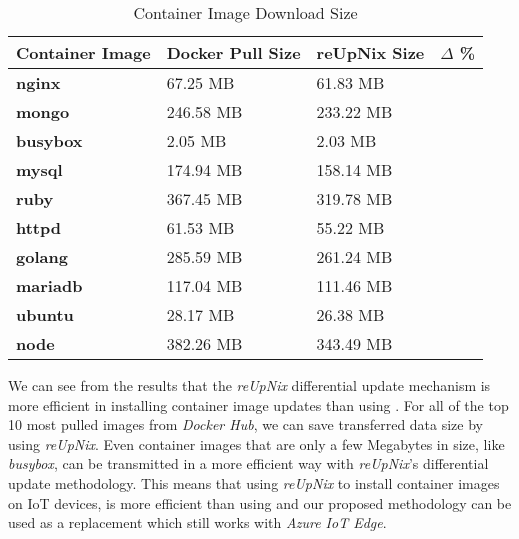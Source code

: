 \clearpage

\begin{table}[H]
	\centering
	\begin{tabular}{l|l|l|l}
	\toprule
		Container Image & Docker Pull Size & reUpNix Size & $\Delta$ \% \\
	\midrule
    \textbf{nginx} & 67.25 MB & 61.83 MB & \color{ba-green}{- 8.0\%} \\
    \textbf{mongo} & 246.58 MB & 233.22 MB & \color{ba-green}{- 5.6\%} \\
    \textbf{busybox} & 2.05 MB & 2.03 MB & \color{ba-green}{- 0.9\%} \\
    \textbf{mysql} & 174.94 MB & 158.14 MB & \color{ba-green}{- 9.6\%} \\
    \textbf{ruby} & 367.45 MB & 319.78 MB & \color{ba-green}{- 12.9\%} \\
    \textbf{httpd} & 61.53 MB & 55.22 MB & \color{ba-green}{- 10.2\%} \\
    \textbf{golang} & 285.59 MB & 261.24 MB & \color{ba-green}{- 8.5\%} \\
    \textbf{mariadb} & 117.04 MB & 111.46 MB & \color{ba-green}{- 4.7\%} \\
    \textbf{ubuntu} & 28.17 MB & 26.38 MB & \color{ba-green}{- 6.3\%} \\
    \textbf{node} & 382.26 MB & 343.49 MB & \color{ba-green}{- 10.1\%} \\
	\bottomrule
	\end{tabular}
	\caption{Container Image Download Size}
	\label{tab:container-size}
\end{table}

\noindent
We can see from the results that the \textit{reUpNix} differential update mechanism
is more efficient in installing container image updates than using .
For all of the top 10 most pulled images from \textit{Docker Hub}, we can save
transferred data size by using \textit{reUpNix}. Even container images that are
only a few Megabytes in size, like \textit{busybox}, can be transmitted in a more
efficient way with \textit{reUpNix}'s differential update methodology. This means
that using \textit{reUpNix} to install container images on \ac{IoT} devices, is more
efficient than using  and our proposed methodology can be used
as a replacement which still works with \textit{Azure IoT Edge}.

